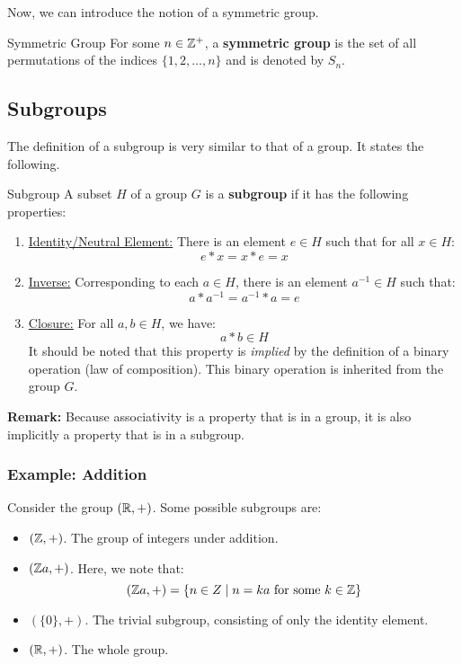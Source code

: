 \documentclass[letterpaper]{article}
\begin{document}
\bigskip 

Now, we can introduce the notion of a symmetric group. 
\begin{definition}{Symmetric Group}{}
    For some $n \in \mathbb{Z}^+$, a \textbf{symmetric group} is the set of all permutations of the indices $\{1, 2, \dots, n\}$ and is denoted by $S_n$. 
\end{definition}


\subsection{Subgroups}
The definition of a subgroup is very similar to that of a group. It states the following. 
\begin{definition}{Subgroup}{}
    A subset $H$ of a group $G$ is a \textbf{subgroup} if it has the following properties: 
    \begin{enumerate}
        \item \underline{Identity/Neutral Element:} There is an element $e \in H$ such that for all $x \in H$:
        \[e * x = x * e = x\]

        \item \underline{Inverse:} Corresponding to each $a \in H$, there is an element $a^{-1} \in H$ such that:
        \[a * a^{-1} = a^{-1} * a = e\]

        \item \underline{Closure:} For all $a, b \in H$, we have:
        \[a * b \in H\]
        It should be noted that this property is \emph{implied} by the definition of a binary operation (law of composition). This binary operation is inherited from the group $G$.  
    \end{enumerate}
\end{definition}
\textbf{Remark:} Because associativity is a property that is in a group, it is also implicitly a property that is in a subgroup. 

\subsubsection{Example: Addition}
Consider the group $(\mathbb{R}, +)$. Some possible subgroups are: 
\begin{itemize}
    \item $(\mathbb{Z}, +)$. The group of integers under addition. 
    \item $(\mathbb{Z} a, +)$. Here, we note that:
    \[(\mathbb{Z} a, +) = \{n \in Z \mid n = ka \text{ for some } k \in \mathbb{Z}\}\]
    \item $(\{0\}, +)$. The trivial subgroup, consisting of only the identity element.
    \item $(\mathbb{R}, +)$. The whole group. 
\end{itemize}
\end{document}
